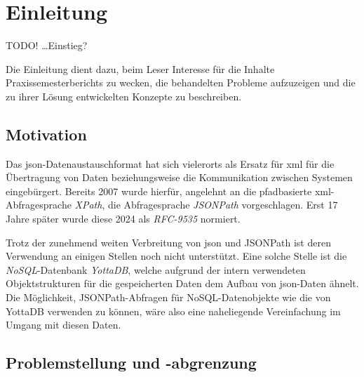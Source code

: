\documentclass[oneside]{ausarbeitung}
\begin{document}
\cleardoublepage
{}
\setcounter{page}{1}






\chapter{Einleitung}
\label{cha:einleitung}


TODO!
…Einstieg?

Die Einleitung dient dazu, beim Leser Interesse für die Inhalte
Praxissemesterberichts zu wecken, die behandelten Probleme aufzuzeigen
und die zu ihrer Lösung entwickelten Konzepte zu beschreiben.





\section{Motivation}
\label{sec:motivation}

Das \ac{json}-Datenaustauschformat hat sich vielerorts als Ersatz für \ac{xml} für die Übertragung von Daten beziehungsweise die Kommunikation zwischen Systemen eingebürgert. Bereits 2007 wurde hierfür, angelehnt an die pfadbasierte \ac{xml}-Abfragesprache \textit{XPath}, die Abfragesprache \textit{JSONPath} vorgeschlagen. Erst 17 Jahre später wurde diese 2024 als \textit{RFC-9535} normiert. 
	
	
Trotz der zunehmend weiten Verbreitung von \ac{json} und JSONPath ist deren Verwendung an einigen Stellen noch nicht unterstützt. Eine solche Stelle ist die \textit{NoSQL}-Datenbank \textit{YottaDB}, welche aufgrund der intern verwendeten Objektstrukturen für die gespeicherten Daten dem Aufbau von \ac{json}-Daten ähnelt. Die Möglichkeit, JSONPath-Abfragen für NoSQL-Datenobjekte wie die von YottaDB verwenden zu können, wäre also eine naheliegende Vereinfachung im Umgang mit diesen Daten.
	





\section{Problemstellung und -abgrenzung}
\label{sec:problemstellung}
\end{document}
